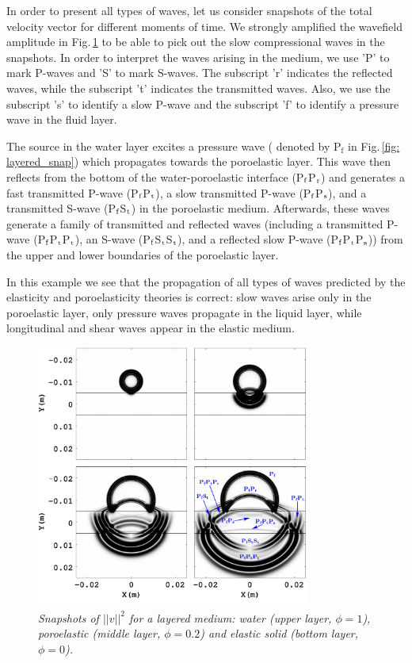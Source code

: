\documentclass[3p,times,table]{article}
\begin{document}
In order to present all types of waves, let us consider snapshots of the total 
velocity vector  for different moments of time. We strongly amplified the 
wavefield amplitude in Fig.\,\ref{fig: layered_snap} to be able to pick out the 
slow compressional waves in the snapshots. In order to interpret the waves arising 
in the medium, we use  'P' to mark P-waves  and  'S' to 
mark S-waves. The subscript 'r'  indicates the reflected waves, while 
the subscript 't'  indicates the transmitted waves. Also, we use the 
subscript 's' to identify a slow P-wave and the subscript 'f' to identify a 
pressure wave in the fluid layer.

The source in the water layer excites a pressure wave ( denoted by P$_\textrm{f}$ in 
Fig.\,\ref{fig: 
layered_snap}) which propagates towards the poroelastic layer.
This wave then reflects from the bottom of the water-poroelastic interface 
(P$_\textrm f$P$_\textrm r$) and generates a fast transmitted P-wave 
(P$_\textrm f$P$_\textrm t$), a slow 
transmitted P-wave (P$_\textrm f$P$_\textrm s$), and a transmitted 
S-wave (P$_\textrm f$S$_\textrm t$) in the  poroelastic medium. Afterwards, 
these waves generate a 
family of transmitted and reflected waves (including a transmitted P-wave 
(P$_\textrm f$P$_\textrm t$P$_\textrm t$), an S-wave 
(P$_\textrm f$S$_\textrm t$S$_\textrm t$), and a
reflected slow P-wave (P$_\textrm f$P$_\textrm t$P$_\textrm s$)) from the  
upper and lower boundaries of 
the poroelastic layer. 

In this example we see that the propagation of all types of waves 
predicted by the elasticity and poroelasticity theories is correct: slow waves arise only 
in the poroelastic layer, only pressure waves propagate in the liquid layer, while  
longitudinal and shear waves appear in the elastic medium.
\begin{figure}[t]%
	\begin{center}
	\includegraphics[draft=false,width=0.8\textwidth]{Figures/Layered_media_u1_u2_v4}
	\end{center}
	\caption{{\footnotesize \it  Snapshots of $ ||v||^2 $ for a layered medium: water (upper 
	layer, $ \phi=1 $), poroelastic (middle layer,  $ \phi=0.2 $) and elastic 
	solid  (bottom layer, $ \phi=0 $).}}
	\label{fig: layered_snap}
\end{figure}
\end{document}
